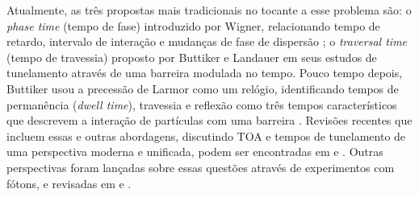  Atualmente, as três propostas mais tradicionais no tocante a esse problema são: o \textit{phase time} (tempo de fase) introduzido por Wigner, relacionando tempo de retardo, intervalo de interação e mudanças de fase de dispersão \cite{wigner}; o \textit{traversal time} (tempo de travessia) \cite{butlan} proposto por Buttiker e Landauer em seus estudos de tunelamento através de uma barreira modulada no tempo. Pouco tempo depois, Buttiker usou a precessão de Larmor como um relógio, identificando tempos de permanência (\textit{dwell time}), travessia e reflexão como três tempos característicos que descrevem a interação de partículas com uma barreira \cite{22}. Revisões recentes que incluem essas e outras abordagens, discutindo TOA e tempos de tunelamento de uma perspectiva moderna e unificada, podem ser encontradas em \cite{24} e \cite{25}. Outras perspectivas foram lançadas sobre essas questões através de experimentos com fótons, e revisadas em \cite{26} e \cite{21}.
